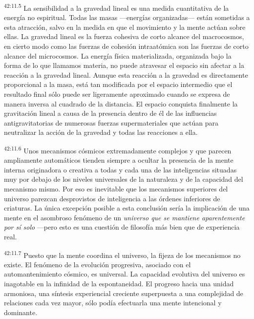 \par
\textsuperscript{42:11.5} La sensibilidad a la gravedad lineal es una medida cuantitativa de la energía no espiritual. Todas las masas ---energías organizadas--- están sometidas a esta atracción, salvo en la medida en que el movimiento y la mente actúan sobre ellas. La gravedad lineal es la fuerza cohesiva de corto alcance del macrocosmos, en cierto modo como las fuerzas de cohesión intraatómica son las fuerzas de corto alcance del microcosmos. La energía física materializada, organizada bajo la forma de lo que llamamos materia, no puede atravesar el espacio sin afectar a la reacción a la gravedad lineal. Aunque esta reacción a la gravedad es directamente proporcional a la masa, está tan modificada por el espacio intermedio que el resultado final sólo puede ser ligeramente aproximado cuando se expresa de manera inversa al cuadrado de la distancia. El espacio conquista finalmente la gravitación lineal a causa de la presencia dentro de él de las influencias antigravitatorias de numerosas fuerzas supermateriales que actúan para neutralizar la acción de la gravedad y todas las reacciones a ella.

\par
\textsuperscript{42:11.6} Unos mecanismos cósmicos extremadamente complejos y que parecen ampliamente automáticos tienden siempre a ocultar la presencia de la mente interna originadora o creativa a todas y cada una de las inteligencias situadas muy por debajo de los niveles universales de la naturaleza y de la capacidad del mecanismo mismo. Por eso es inevitable que los mecanismos superiores del universo parezcan desprovistos de inteligencia a las órdenes inferiores de criaturas. La única excepción posible a esta conclusión sería la implicación de una mente en el asombroso fenómeno de un \textit{universo que se mantiene aparentemente por sí solo} ---pero esto es una cuestión de filosofía más bien que de experiencia real.

\par
\textsuperscript{42:11.7} Puesto que la mente coordina el universo, la fijeza de los mecanismos no existe. El fenómeno de la evolución progresiva, asociado con el automantenimiento cósmico, es universal. La capacidad evolutiva del universo es inagotable en la infinidad de la espontaneidad. El progreso hacia una unidad armoniosa, una síntesis experiencial creciente superpuesta a una complejidad de relaciones cada vez mayor, sólo podía efectuarla una mente intencional y dominante.

